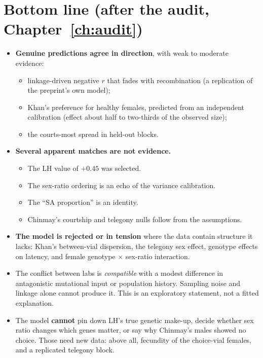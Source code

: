 \section{Bottom line (after the audit, Chapter~\ref{ch:audit})}
\begin{itemize}
\item \textbf{Genuine predictions agree in direction}, with weak to moderate evidence:
  \begin{itemize}
  \item linkage-driven negative $r$ that fades with recombination (a replication of the preprint's own model);
  \item Khan's preference for healthy females, predicted from an independent calibration (effect about half to two-thirds of the observed size);
  \item the courts-most spread in held-out blocks.
  \end{itemize}
\item \textbf{Several apparent matches are not evidence.}
  \begin{itemize}
  \item The LH value of $+0.45$ was selected.
  \item The sex-ratio ordering is an echo of the variance calibration.
  \item The ``SA proportion'' is an identity.
  \item Chinmay's courtship and telegony nulls follow from the assumptions.
  \end{itemize}
\item \textbf{The model is rejected or in tension} where the data contain structure it lacks: Khan's between-vial dispersion, the telegony sex effect, genotype effects on latency, and female genotype $\times$ sex-ratio interaction.
\item The conflict between labs is \emph{compatible} with a modest difference in antagonistic mutational input or population history. Sampling noise and linkage alone cannot produce it. This is an exploratory statement, not a fitted explanation.
\item The model \textbf{cannot} pin down LH's true genetic make-up, decide whether sex ratio changes which genes matter, or say why Chinmay's males showed no choice. Those need new data: above all, fecundity of the choice-vial females, and a replicated telegony block.
\end{itemize}
